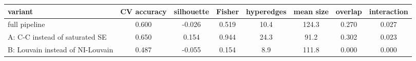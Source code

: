 \begin{tabular}{lccccccc}
\toprule
variant & CV accuracy & silhouette & Fisher & hyperedges & mean size & overlap & interaction \\
\midrule
full pipeline & 0.600 & -0.026 & 0.519 & 10.4 & 124.3 & 0.270 & 0.027 \\
A: C-C instead of saturated SE & 0.650 & 0.154 & 0.944 & 24.3 & 91.2 & 0.302 & 0.023 \\
B: Louvain instead of NI-Louvain & 0.487 & -0.055 & 0.154 & 8.9 & 111.8 & 0.000 & 0.000 \\
\bottomrule
\end{tabular}
